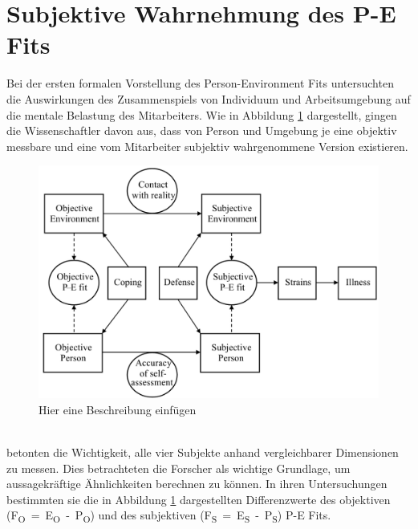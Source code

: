 \section{Subjektive Wahrnehmung des P-E Fits}
\label{ch:personEnvironmentFit:subjektivObjektiv}
Bei der ersten formalen Vorstellung des Person-Environment Fits untersuchten \textcite{copingAndAdaption:1974} die Auswirkungen des Zusammenspiels von Individuum und Arbeitsumgebung auf die mentale Belastung des Mitarbeiters. Wie in Abbildung \ref{fig:personEnvironmentFit:subjektivObjektiv:abb1} dargestellt, gingen die Wissenschaftler davon aus, dass von Person und Umgebung je eine objektiv messbare und eine vom Mitarbeiter subjektiv wahrgenommene Version existieren. \\
\begin{figure}[h]
	\centering
	\includegraphics[width=1\textwidth]{gfx/subjektivObjektivPEFit.png}
	\caption{Hier eine Beschreibung einfügen \cite[S. 22]{edwards:2008}}
	\label{fig:personEnvironmentFit:subjektivObjektiv:abb1}
\end{figure}
\\
\textcite{copingAndAdaption:1974} betonten die Wichtigkeit, alle vier Subjekte anhand vergleichbarer Dimensionen zu messen. Dies betrachteten die Forscher als wichtige Grundlage, um aussagekräftige Ähnlichkeiten berechnen zu können. In ihren Untersuchungen bestimmten sie die in Abbildung \ref{fig:personEnvironmentFit:subjektivObjektiv:abb1} dargestellten Differenzwerte des objektiven \mbox{(F\textsubscript{O} = E\textsubscript{O} - P\textsubscript{O})} und des subjektiven \mbox{(F\textsubscript{S} = E\textsubscript{S} - P\textsubscript{S})} P-E Fits.\\
